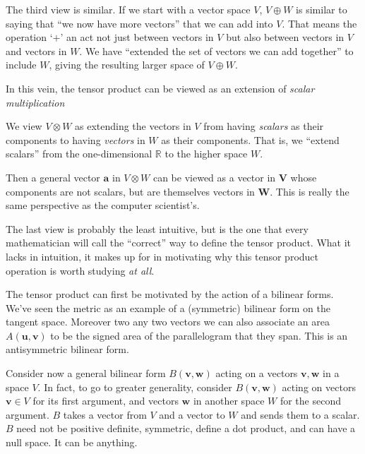 \documentclass[../master.tex]{subfiles}
\begin{document}
	The third view is similar. If we start with a vector space $V$, $V \oplus W$ is similar to saying that ``we now have more vectors'' that we can add into $V$. That means the operation `$+$' an act not just between vectors in $V$ but also between vectors in $V$ and vectors in $W$. We have ``extended the set of vectors we can add together'' to include $W$, giving the resulting larger space of $V \oplus W$.
	
	In this vein, the tensor product can be viewed as an extension of \emph{scalar multiplication}
	
	\begin{view}
		We view $V \otimes W$ as extending the vectors in $V$ from having \emph{scalars} as their components to having \emph{vectors} in $W$ as their components. That is, we ``extend scalars'' from the one-dimensional $\mathbb R$ to the higher space $W$.
	\end{view}
	Then a general vector $\mathbf a$ in $V \otimes W$ can be viewed as a vector in $\mathbf V$ whose components are not scalars, but are themselves vectors in $\mathbf W$. This is really the same perspective as the computer scientist's.
	
	The last view is probably the least intuitive, but is the one that every mathematician will call the ``correct'' way to define the tensor product. What it lacks in intuition, it makes up for in motivating why this tensor product operation is worth studying \emph{at all}.
	
	
	The tensor product can first be motivated by the action of a bilinear forms. We've seen the metric as an example of a (symmetric) bilinear form on the tangent space. Moreover two any two vectors we can also associate an area $A(\mathbf u, \mathbf v)$ to be the signed area of the parallelogram that they span. This is an antisymmetric bilinear form.
	
	Consider now a general bilinear form $B(\mathbf v, \mathbf w)$ acting on a vectors $\mathbf v,\mathbf w$ in a space $V$. In fact, to go to greater generality, consider $B(\mathbf v, \mathbf w)$ acting on vectors $\mathbf v \in V$ for its first argument, and vectors $\mathbf w$ in another space $W$ for the second argument. $B$ takes a vector from $V$ and a vector to $W$ and sends them to a scalar. $B$ need not be positive definite, symmetric, define a dot product, and can have a null space. It can be anything.
	
\end{document}
